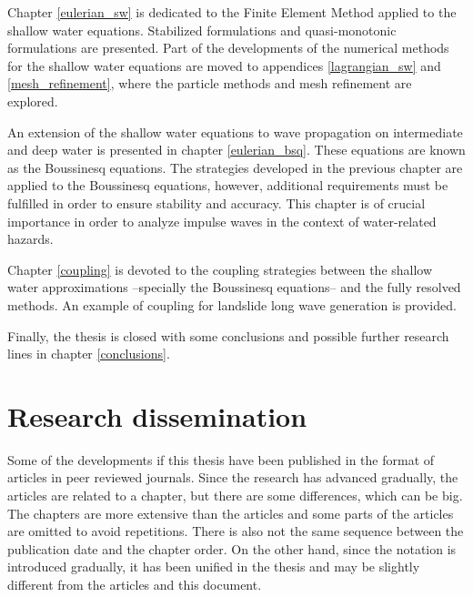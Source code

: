 Chapter \ref{eulerian_sw} is dedicated to the Finite Element Method applied to the shallow water equations. Stabilized formulations and quasi-monotonic formulations are presented.
Part of the developments of the numerical methods for the shallow water equations are moved to appendices \ref{lagrangian_sw} and \ref{mesh_refinement}, where the particle methods and mesh refinement are explored.

An extension of the shallow water equations to wave propagation on intermediate and deep water is presented in chapter \ref{eulerian_bsq}. These equations are known as the Boussinesq equations. The strategies developed in the previous chapter are applied to the Boussinesq equations, however, additional requirements must be fulfilled in order to ensure stability and accuracy. This chapter is of crucial importance in order to analyze impulse waves in the context of water-related hazards.

Chapter \ref{coupling} is devoted to the coupling strategies between the shallow water approximations --specially the Boussinesq equations-- and the fully resolved methods. An example of coupling for landslide long wave generation is provided.

Finally, the thesis is closed with some conclusions and possible further research lines in chapter \ref{conclusions}.



\section{Research dissemination}


Some of the developments if this thesis have been published in the format of articles in peer reviewed journals. Since the research has advanced gradually, the articles are related to a chapter, but there are some differences, which can be big.
The chapters are more extensive than the articles and some parts of the articles are omitted to avoid repetitions.
There is also not the same sequence between the publication date and the chapter order.
On the other hand, since the notation is introduced gradually, it has been unified in the thesis and may be slightly different from the articles and this document.

